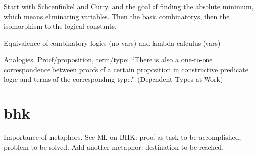 \begin{ednote}
  Start with Schoenfinkel and Curry, and the goal of finding the
  absolute minimum, which means eliminating variables.  Then the basic
  combinatorys, then the isomorphism to the logical constants.

  Equivalence of combinatory logics (no vars) and lambda calculus (vars)
\end{ednote}


Analogies.  Proof/proposition, term/type: ``There is also a one-to-one
correspondence between proofs of a certain proposition in constructive
predicate logic and terms of the corresponding type.'' (Dependent Types at Work)

\section{bhk}
\label{sect:bhk}


\begin{ednote}
  Importance of metaphors.  See ML on BHK: proof as task to be
  accomplished, problem to be solved.  Add another metaphor:
  destination to be reached.
\end{ednote}
